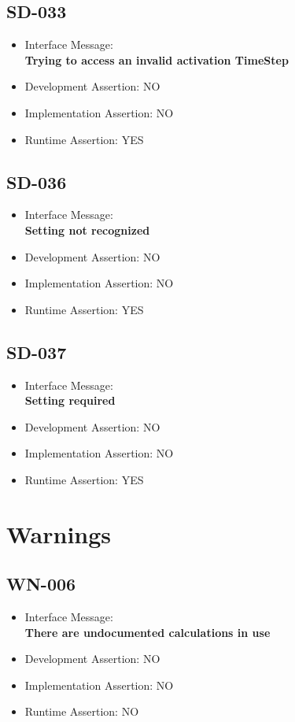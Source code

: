 \subsection{SD-033}
\begin{itemize}
  \item Interface Message:\\[1em]\textbf{Trying to access an invalid activation TimeStep}
  \item Development Assertion: NO
  \item Implementation Assertion: NO
  \item Runtime Assertion: YES
\end{itemize}

\subsection{SD-036}
\begin{itemize}
  \item Interface Message:\\[1em]\textbf{Setting not recognized}
  \item Development Assertion: NO
  \item Implementation Assertion: NO
  \item Runtime Assertion: YES
\end{itemize}

\subsection{SD-037}
\begin{itemize}
  \item Interface Message:\\[1em]\textbf{Setting required}
  \item Development Assertion: NO
  \item Implementation Assertion: NO
  \item Runtime Assertion: YES
\end{itemize}

\section{Warnings}

\subsection{WN-006}
\begin{itemize}
  \item Interface Message:\\[1em]\textbf{There are undocumented calculations in use}
  \item Development Assertion: NO
  \item Implementation Assertion: NO
  \item Runtime Assertion: NO
\end{itemize}

